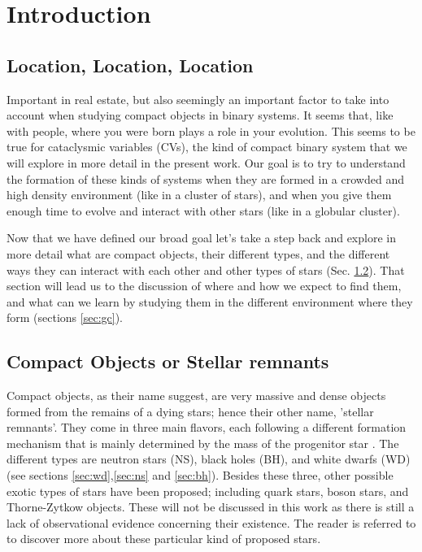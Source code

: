 \chapter{Introduction}
\thispagestyle{fancy}


\section{Location, Location, Location}

Important in real estate, but also seemingly an important factor to take into account when studying compact objects in binary systems. It seems that, like with people, where you were born plays a role in your evolution. This seems to be true for cataclysmic variables (CVs), the kind of compact binary system that we will explore in more detail in the present work. Our goal is to try to understand the formation of these kinds of systems when they are formed in a crowded and high density environment (like in a cluster of stars), and when you give them enough time to evolve and interact with other stars (like in a globular cluster).  

Now that we have defined our broad goal let's take a step back and explore in more detail what are compact objects, their different types, and the different ways they can interact with each other and other types of stars (Sec. \ref{sec:co}). That section will lead us to the discussion of where and how we expect to find them, and what can we learn by studying them in the different environment where they form (sections \ref{sec:gc}).

\section{Compact Objects or Stellar remnants}\label{sec:co}

Compact objects, as their name suggest, are very massive and dense objects formed from the remains of a dying stars; hence their other name, 'stellar remnants'. They come in three main flavors, each following a different formation mechanism that is mainly determined by the mass of the progenitor star \citep{de2008stars}. The different types are neutron stars (NS), black holes (BH), and white dwarfs (WD) (see sections \ref{sec:wd},\ref{sec:ns} and \ref{sec:bh}). Besides these three, other possible exotic types of stars have been proposed; including quark stars, boson stars, and Thorne-Zytkow objects. These will not be discussed in this work as there is still a lack of observational evidence concerning their existence. The reader is referred to \cite{cleymans_physics_1999} to discover more about these particular kind of proposed stars. 

